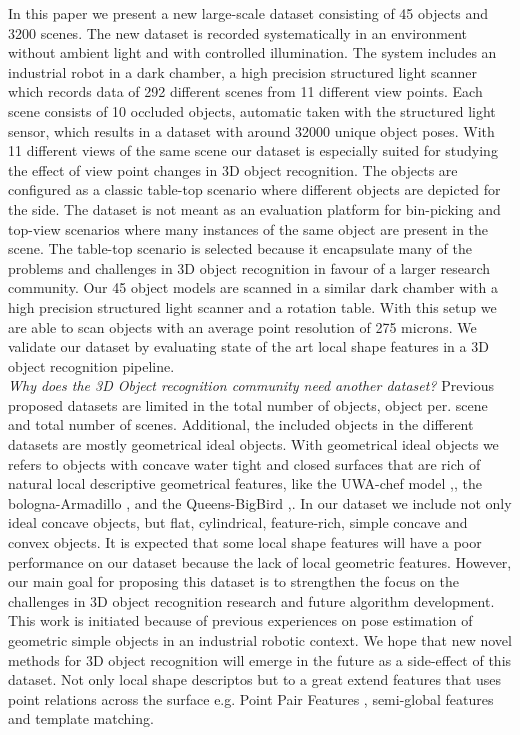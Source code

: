 \documentclass[10pt,twocolumn,letterpaper]{article}
\begin{document}
In this paper we present a new large-scale dataset consisting of 45 objects and 3200 scenes. The new dataset is recorded systematically in an environment without ambient light and with controlled illumination. The system includes an industrial robot in a dark chamber, a high precision structured light scanner which records data of 292 different scenes from 11 different view points. Each scene consists of 10 occluded objects, automatic taken with the structured light sensor, which results in a dataset with around 32000 unique object poses. With 11 different views of the same scene our dataset is especially suited for studying the effect of view point changes in 3D object recognition. The objects are configured as a classic table-top scenario where different objects are depicted for the side. The dataset is not meant as an evaluation platform for bin-picking and top-view scenarios where many instances of the same object are present in the scene. The table-top scenario is selected because it encapsulate many of the problems and challenges in 3D object recognition in favour of a larger research community.
Our 45 object models are scanned in a similar dark chamber with a high precision structured light scanner and a rotation table. With this setup we are able to scan objects with an average point resolution of 275 microns. We validate our dataset by evaluating state of the art local shape features in a 3D object recognition pipeline.\\ %
\textit{Why does the 3D Object recognition community need another dataset?} Previous proposed datasets are limited in the total number of objects, object per. scene and total number of scenes. Additional, the included objects in the different datasets are mostly geometrical ideal objects. With geometrical ideal objects we refers to objects with concave water tight and closed surfaces that are rich of natural local descriptive geometrical features, like the UWA-chef model \cite{Mian2006},\cite{Mian2010}, the bologna-Armadillo \cite{Salti2014},\cite{Tombari2010} and the Queens-BigBird \cite{Taati2007},\cite{Taati2007}. In our dataset we include not only ideal concave objects, but flat, cylindrical, feature-rich, simple concave and convex objects. It is expected that some local shape features will have a poor performance on our dataset because the lack of local geometric features. However, our main goal for proposing this dataset is to strengthen the focus on the challenges in 3D object recognition research and future algorithm development. This work is initiated because of previous experiences on pose estimation of geometric simple objects in an industrial robotic context. We hope that new novel methods for 3D object recognition will emerge in the future as a side-effect of this dataset. Not only local shape descriptos but to a great extend features that uses point relations across the surface e.g. Point Pair Features \cite{BirdalIlic2015}, semi-global features and template matching.    
\end{document}
